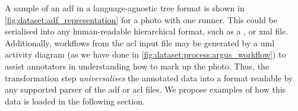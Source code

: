 A sample of an \gls{adf} in a language-agnostic tree format is shown in \cref{fig:dataset:adf_representation} for a photo with one runner. This could be serialised into any human-readable hierarchical format, such as a ,  or \gls{xml} file. Additionally, workflows from the \gls{acl} input file may be generated by a \gls{uml} activity diagram (as we have done in \cref{fig:dataset:process:argus_workflow}) to assist annotators in understanding how to mark up the photo. Thus, the transformation step \textit{universalises} the annotated data into a format readable by any supported parser of the \gls{adf} or \gls{acl} files. We propose examples of how this data is loaded in the following section.

\renewcommand*\DTstyle{\small\rmfamily}
\setlength{\DTbaselineskip}{15pt}


